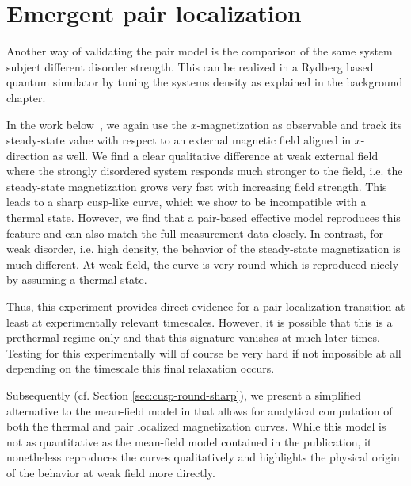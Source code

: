

\section{Emergent pair localization}
Another way of validating the pair model is the comparison of the same system subject different disorder strength. This can be realized in a Rydberg based quantum simulator by tuning the systems density as explained in the background chapter. %

In the work below~\cite{franzEmergentPairLocalization2022}, we again use the $x$-magnetization as observable and track its steady-state value with respect to an external magnetic field aligned in $x$-direction as well. We find a clear qualitative difference at weak external field where the strongly disordered system responds much stronger to the field, i.e. the steady-state magnetization grows very fast with increasing field strength. This leads to a sharp cusp-like curve, which we show to be incompatible with a thermal state. However, we find that a pair-based effective model reproduces this feature and can also match the full measurement data closely.
In contrast, for weak disorder, i.e. high density, the behavior of the steady-state magnetization is much different. At weak field, the curve is very round which is reproduced nicely by assuming a thermal state.

Thus, this experiment provides direct evidence for a pair localization transition at least at experimentally relevant timescales. However, it is possible that this is a prethermal regime only and that this signature vanishes at much later times. Testing for this experimentally will of course be very hard if not impossible at all depending on the timescale this final relaxation occurs.

Subsequently (cf. Section \ref{sec:cusp-round-sharp}), we present a simplified alternative to the mean-field model in \cite{franzEmergentPairLocalization2022} that allows for analytical computation of both the thermal and pair localized magnetization curves. While this model is not as quantitative as the mean-field model contained in the publication, it nonetheless reproduces the curves qualitatively and highlights the physical origin of the behavior at weak field more directly.




